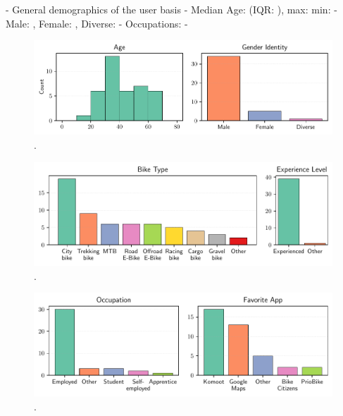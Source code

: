 - General demographics of the user basis
- Median Age: (IQR: ), max: min: 
- Male: , Female: , Diverse: 
- Occupations: 
- 
\begin{figure}[t]
\caption{.}\label{fig:}
\includegraphics[width=\linewidth]{images/app-demographics-gender-age.pdf}
\end{figure}

\begin{figure}[t]
\caption{.}\label{fig:}
\includegraphics[width=\linewidth]{images/app-demographics-bike-type-experience.pdf}
\end{figure}

\begin{figure}[t]
\caption{.}\label{fig:}
\includegraphics[width=\linewidth]{images/app-demographics-occupation-favorite-app.pdf}
\end{figure}



